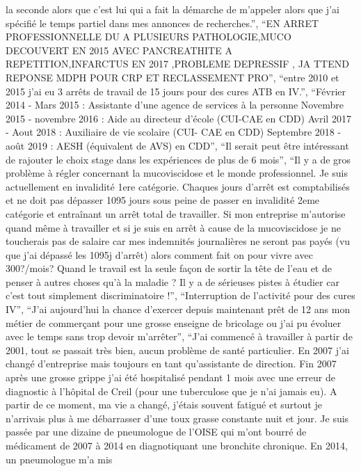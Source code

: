 \documentclass[
  letterpaper,
  DIV=11,
  numbers=noendperiod]{scrartcl}
\begin{document}
\begin{itemize}
  la seconde alors que c'est lui qui a fait la démarche de m'appeler
  alors que j'ai spécifié le temps partiel dans mes annonces de
  recherches.'', ``EN ARRET PROFESSIONNELLE DU A PLUSIEURS
  PATHOLOGIE,MUCO DECOUVERT EN 2015 AVEC PANCREATHITE A
  REPETITION,INFARCTUS EN 2017 ,PROBLEME DEPRESSIF , JA TTEND REPONSE
  MDPH POUR CRP ET RECLASSEMENT PRO'', ``entre 2010 et 2015 j'ai eu 3
  arrêts de travail de 15 jours pour des cures ATB en IV.'', ``Février
  2014 - Mars 2015 : Assistante d'une agence de services à la personne
  Novembre 2015 - novembre 2016 : Aide au directeur d'école (CUI-CAE en
  CDD) Avril 2017 - Aout 2018 : Auxiliaire de vie scolaire (CUI- CAE en
  CDD) Septembre 2018 - août 2019 : AESH (équivalent de AVS) en CDD'',
  ``Il serait peut être intéressant de rajouter le choix stage dans les
  expériences de plus de 6 mois'', ``Il y a de gros problème à régler
  concernant la mucoviscidose et le monde professionnel. Je suis
  actuellement en invalidité 1ere catégorie. Chaques jours d'arrêt est
  comptabilisés et ne doit pas dépasser 1095 jours sous peine de passer
  en invalidité 2eme catégorie et entraînant un arrêt total de
  travailler. Si mon entreprise m'autorise quand même à travailler et si
  je suis en arrêt à cause de la mucoviscidose je ne toucherais pas de
  salaire car mes indemnités journalières ne seront pas payés (vu que
  j'ai dépassé les 1095j d'arrêt) alors comment fait on pour vivre avec
  300?/mois? Quand le travail est la seule façon de sortir la tête de
  l'eau et de penser à autres choses qu'à la maladie ? Il y a de
  sérieuses pistes à étudier car c'est tout simplement discriminatoire
  !'', ``Interruption de l'activité pour des cures IV'', ``J'ai
  aujourd'hui la chance d'exercer depuis maintenant prêt de 12 ans mon
  métier de commerçant pour une grosse enseigne de bricolage ou j'ai pu
  évoluer avec le temps sans trop devoir m'arrêter'', ``J'ai commencé à
  travailler à partir de 2001, tout se passait très bien, aucun problème
  de santé particulier. En 2007 j'ai changé d'entreprise mais toujours
  en tant qu'assistante de direction. Fin 2007 après une grosse grippe
  j'ai été hospitalisé pendant 1 mois avec une erreur de diagnostic à
  l'hôpital de Creil (pour une tuberculose que je n'ai jamais eu). A
  partir de ce moment, ma vie a changé, j'étais souvent fatigué et
  surtout je n'arrivais plus à me débarrasser d'une toux grasse
  constante nuit et jour. Je suis passée par une dizaine de pneumologue
  de l'OISE qui m'ont bourré de médicament de 2007 à 2014 en
  diagnotiquant une bronchite chronique. En 2014, un pneumologue m'a mis

\end{itemize}
\end{document}
